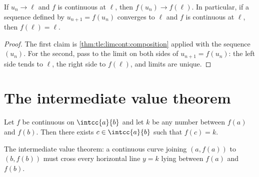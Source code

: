 \begin{proposition}\label{prop:tle:limcont:seqcont}
If $u_n \to \ell$ and $f$ is continuous at $\ell$, then $f(u_n) \to f(\ell)$.
In particular, if a sequence defined by $u_{n+1} = f(u_n)$ converges to
$\ell$ and $f$ is continuous at $\ell$, then $f(\ell) = \ell$.
\end{proposition}

\begin{proof}
The first claim is \cref{thm:tle:limcont:composition} applied with the
sequence $(u_n)$. For the second, pass to the limit on both sides of
$u_{n+1} = f(u_n)$: the left side tends to $\ell$, the right side to
$f(\ell)$, and limits are unique.
\end{proof}

\section{The intermediate value theorem}

\begin{theorem}\label{thm:tle:limcont:ivt}
Let $f$ be continuous on $\intcc{a}{b}$ and let $k$ be any number between
$f(a)$ and $f(b)$. Then there exists $c \in \intcc{a}{b}$ such that
$f(c) = k$.
\end{theorem}

\begin{omfigure}

{\small The intermediate value theorem: a continuous curve joining
$(a, f(a))$ to $(b, f(b))$ must cross every horizontal line
$y = k$ lying between $f(a)$ and $f(b)$.}
\end{omfigure}

